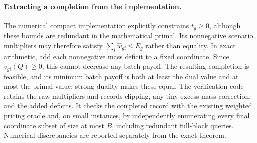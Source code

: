 \paragraph{Extracting a completion from the implementation.}
The numerical compact implementation explicitly constrains $t_g\geq0$,
although these bounds are redundant in the mathematical primal. Its
nonnegative scenario multipliers may therefore satisfy
$\sum_i\widehat w_{gi}\leq E_g$ rather than equality. In exact arithmetic,
add each nonnegative mass deficit to a fixed coordinate. Since
$v_{gi}(Q)\geq0$, this cannot decrease any batch payoff. The resulting
completion is feasible, and its minimum batch payoff is both at least the
dual value and at most the primal value; strong duality makes these equal.
The verification code retains the raw multipliers and records clipping,
any tiny excess-mass correction, and the added deficits. It checks the
completed record with the existing weighted pricing oracle and, on small
instances, by independently enumerating every final coordinate subset
of size at most $B$, including redundant full-block queries. Numerical
discrepancies are reported separately from the exact theorem.
